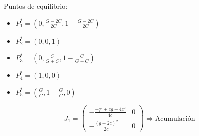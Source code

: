 \documentclass[twocolumn,aps,prl]{revtex4-1}
\begin{document}
Puntos de equilibrio:
\begin{itemize}
    \item[] $P_1^* = (0, \frac{G-2C}{2C}, 1 - \frac{G-2C}{2C})$
    \item[] $P_2^* = (0, 0, 1)$
    \item[] $P_3^* = (0, \frac{C}{G+C}, 1 - \frac{C}{G+C})$
    \item[] $P_4^* = (1, 0, 0)$
    \item[] $P_5^* = (\frac{G}{C}, 1- \frac{G}{C}, 0)$
\end{itemize}
$$J_1 =
\begin{pmatrix}
    -\frac{-g^2+cg+4c^2}{4c}
    &
    0
    \\  
    -\frac{\left(g-2c\right)^2}{2c}
    &
    0
\end{pmatrix}
\Rightarrow \text{Acumulación}
$$
\end{document}
